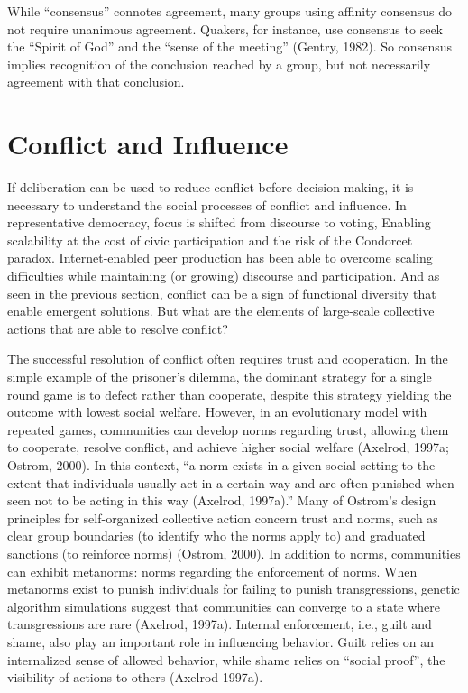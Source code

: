 While ``consensus'' connotes agreement, many groups using affinity consensus do not require unanimous agreement. Quakers, for instance, use consensus to seek the ``Spirit of God'' and the ``sense of the meeting'' (Gentry, 1982). So consensus implies recognition of the conclusion reached by a group, but not necessarily agreement with that conclusion.

\section{Conflict and Influence}
If deliberation can be used to reduce conflict before decision-making,
it is necessary to understand the social processes of conflict and influence.
In representative democracy, focus is shifted from discourse to voting, 
Enabling scalability at the cost of civic participation and the risk of the Condorcet paradox. Internet-enabled peer production has been able to overcome scaling difficulties while maintaining (or growing) discourse and participation. And as seen in the previous section, conflict can be a sign of functional diversity that enable emergent solutions. But what are the elements of large-scale collective actions that are able to resolve conflict?

The successful resolution of conflict often requires trust and cooperation. In the simple example of the prisoner's dilemma, the dominant strategy for a single round game is to defect rather than cooperate, despite this strategy yielding the outcome with lowest social welfare. However, in an evolutionary model with repeated games, communities can develop norms regarding trust, allowing them to cooperate, resolve conflict, and achieve higher social welfare (Axelrod, 1997a; Ostrom, 2000). In this context, ``a norm exists in a given social setting to the extent that individuals usually act in a certain way and are often punished when seen not to be acting in this way (Axelrod, 1997a).'' Many of Ostrom's design principles for self-organized collective action concern trust and norms, such as clear group boundaries (to identify who the norms apply to) and graduated sanctions (to reinforce norms) (Ostrom, 2000). In addition to norms, communities can exhibit metanorms: norms regarding the enforcement of norms. When metanorms exist to punish individuals for failing to punish transgressions, genetic algorithm simulations suggest that communities can converge to a state where transgressions are rare (Axelrod, 1997a). Internal enforcement, i.e., guilt and shame, also play an important role in influencing behavior. Guilt relies on an internalized sense of allowed behavior, while shame relies on ``social proof'', the visibility of actions to others (Axelrod 1997a).

